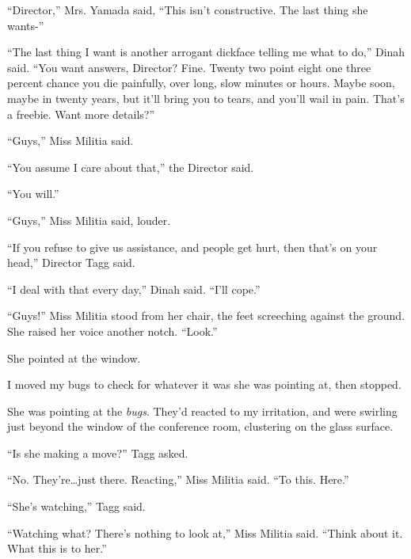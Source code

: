 ``Director,'' Mrs. Yamada said, ``This isn't constructive.  The last thing she wants-''



``The last thing I want is another arrogant dickface telling me what to do,'' Dinah said.  ``You want answers, Director?  Fine.  Twenty two point eight one three percent chance you die painfully, over long, slow minutes or hours.  Maybe soon, maybe in twenty years, but it'll bring you to tears, and you'll wail in pain.  That's a freebie.  Want more details?''



``Guys,'' Miss Militia said.



``You assume I care about that,'' the Director said.



``You will.''



``Guys,'' Miss Militia said, louder.



``If you refuse to give us assistance, and people get hurt, then that's on your head,'' Director Tagg said.



``I deal with that every day,'' Dinah said.  ``I'll cope.''



``Guys!''  Miss Militia stood from her chair, the feet screeching against the ground.  She raised her voice another notch.  ``Look.''



She pointed at the window.



I moved my bugs to check for whatever it was she was pointing at, then stopped.



She was pointing at the \emph{bugs}.  They'd reacted to my irritation, and were swirling just beyond the window of the conference room, clustering on the glass surface.



``Is she making a move?''  Tagg asked.



``No.  They're\ldots just there.  Reacting,'' Miss Militia said.  ``To this.  Here.''



``She's watching,'' Tagg said.



``Watching what?  There's nothing to look at,'' Miss Militia said.  ``Think about it.  What this is to her.''



